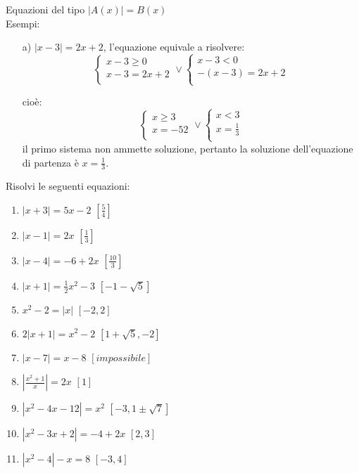 Equazioni del tipo $|A(x)|=B(x)$\\
Esempi:
\begin{enumerate}
        \item[a)] $|x-3|=2x+2$, l'equazione equivale a risolvere:
        $$
        \left\lbrace 
        \begin{array}{l}
        x-3\geq 0 \\
        x-3=2x+2\\
        \end{array}
        \right.
        \vee
        \left\lbrace 
        \begin{array}{l}
        x-3< 0 \\
        -(x-3)=2x+2\\
        \end{array}
        \right.
        $$      

        cioè:
        $$
        \left\lbrace 
        \begin{array}{l}
        x\geq 3 \\
        x=-52\\
        \end{array}
        \right.
        \vee
        \left\lbrace 
        \begin{array}{l}
        x< 3 \\
        x=\frac{1}{3}\\
        \end{array}
        \right.
        $$
il primo sistema non ammette soluzione, pertanto la soluzione dell'equazione di 
partenza è $    x=\frac{1}{3}$.
\end{enumerate}

Risolvi le seguenti equazioni:

\begin{enumerate}
\item $\left| x+3 \right| =5x-2 $ \hfill $\left[ \frac{5}{4}\right] $
\item $\left| x-1 \right| =2x $ \hfill $\left[ \frac{1}{3}\right] $
\item $\left| x-4 \right| =-6+2x $ \hfill $\left[ \frac{10}{3}\right] $
\item $\left| x+1 \right| =\frac{1}{2}x^2-3 $ \hfill $\left[ -1-\sqrt{5}\right] 
$
\item $x^2-2= \left| x \right| $ \hfill $\left[ -2, 2\right] $
\item $2\left| x+1 \right| =x^2-2 $ \hfill $\left[1+\sqrt{5}, -2\right] $
\item $\left| x-7 \right| =x-8 $ \hfill $\left[ impossibile\right] $
\item $\left| \frac{x^2+1}{x} \right| =2x $ \hfill $\left[ 1 \right] $
\item $\left| x^2-4x-12 \right| =x^2 $ \hfill $\left[ -3, 1\pm \sqrt{7}\right] $
\item $\left| x^2-3x+2 \right| =-4+2x $ \hfill $\left[ 2, 3\right] $
\item $\left| x^2-4 \right| -x=8 $ \hfill $\left[ -3, 4\right] $
\end{enumerate}


